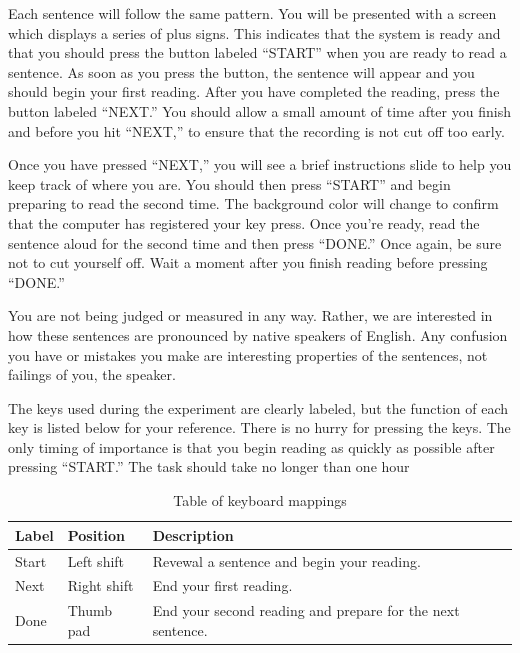 \documentclass[12pt,oneside]{book}
\begin{document}
Each sentence will follow the same pattern. You will be presented with a screen which displays a series of plus signs. This indicates that the system is ready and that you should press the button labeled ``START'' when you are ready to read a sentence. As soon as you press the button, the sentence will appear and you should begin your first reading. After you have completed the reading, press the button labeled ``NEXT.'' You should allow a small amount of time after you finish and before you hit ``NEXT,'' to ensure that the recording is not cut off too early.

Once you have pressed ``NEXT,'' you will see a brief instructions slide to help you keep track of where you are. You should then press ``START'' and begin preparing to read the second time. The background color will change to confirm that the computer has registered your key press. Once you're ready, read the sentence aloud for the second time and then press ``DONE.'' Once again, be sure not to cut yourself off. Wait a moment after you finish reading before pressing ``DONE.''

You are not being judged or measured in any way. Rather, we are interested in how these sentences are pronounced by native speakers of English. Any confusion you have or mistakes you make are interesting properties of the sentences, not failings of you, the speaker.

The keys used during the experiment are clearly labeled, but the function of each key is listed below for your reference. There is no hurry for pressing the keys. The only timing of importance is that you begin reading as quickly as possible after pressing ``START.'' The task should take no longer than one hour

\begin{table}[!h]

\caption{\label{tab:keytab}Table of keyboard mappings}
\centering
\begin{tabular}{lll}
\toprule
Label & Position & Description\\
\midrule
Start & Left shift & Revewal a sentence and begin your reading.\\
Next & Right shift & End your first reading.\\
Done & Thumb pad & End your second reading and prepare for the next sentence.\\
\bottomrule
\end{tabular}
\end{table}

\newpage
\end{document}
